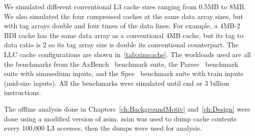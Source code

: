 We simulated different conventional L3 cache sizes ranging from 0.5MB to 8MB. We also simulated the four compressed caches at the same data array sizes, but with tag arrays double and four times of the data lines. For example, a 4MB-2 BDI cache has the same data array as a conventional 4MB cache, but its tag to data ratio is 2 so its tag array size is double its conventional counterpart. The LLC cache configurations are shown in~\ref{tab:simcache}. The workloads used are all the benchmarks from the AxBench~\cite{axbench} benchmark suite, the Parsec~\cite{parsec} benchmark suite with simmedium inputs, and the Spec~\cite{spec} benchmark suite with train inputs (mid-size inputs). All the benchmarks were simulated until end or 3 billion instructions.\par
The offline analysis done in Chapters~\ref{ch:BackgroundMotiv} and~\ref{ch:Design} were done using a modified version of zsim. zsim was used to dump cache contents every 100,000 L3 accesses, then the dumps were used for analysis.

